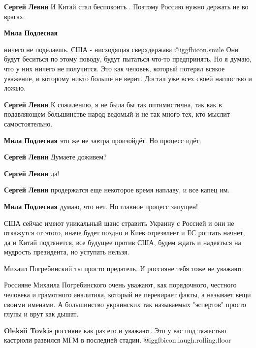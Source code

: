 \begin{itemize}
\begin{itemize} %
\textbf{Сергей Левин} И Китай стал беспокоить . Поэтому Россию нужно держать не во врагах.

\textbf{Мила Подлесная} 

ничего не поделаешь. США - нисходящая сверхдержава  @igg{fbicon.smile}  Они будут беситься по
этому поводу, будут пытаться что-то предпринять. Но я думаю, что у них ничего
не получится. Это как человек, который потерял всякое уважение, и которому
никто больше не верит. Достал уже всех своей наглостью и ложью.


\textbf{Сергей Левин} К сожалению, я не была бы так оптимистична, так как в подавляющем большинстве народ ведомый и не так много тех, кто мыслит самостоятельно.

\textbf{Мила Подлесная} это же не завтра произойдёт. Но процесс идёт.

\textbf{Сергей Левин} Думаете доживем?

\textbf{Сергей Левин} да!

\textbf{Сергей Левин} продержатся еще некоторое время наплаву, и все капец им.

\textbf{Мила Подлесная} думаю, что нет. Но главное процесс запущен!
\end{itemize} %


США сейчас имеют уникальный шанс стравить Украину с Россией и они не откажутся
от этого, иначе будет поздно и Киев отрезвлеет и ЕС роптать начнет, да и Китай
подтянется, все будущее против США, будем ждать и надеяться на мудрость
президента, но уступать нельзя.


Михаил Погребинский ты просто предатель. И россияне тебя тоже не уважают.

\begin{itemize} %

Россияне Михаила Погребинского очень уважают, как порядочного, честного
человека и грамотного аналитика, который не перевирает факты, а называет вещи
своими именами. А большинство украинских так называемых "эспертов" просто глупы
и врут как дышат.

\textbf{Oleksii Tovkis} россияне как раз его и уважают. Это у вас под тяжестью кастрюли развился МГМ в последней стадии. @igg{fbicon.laugh.rolling.floor} 


\end{itemize}
\end{itemize}
